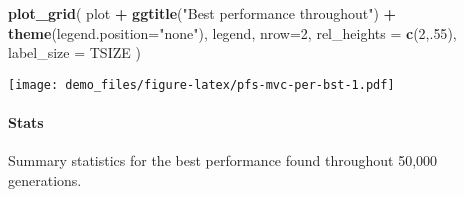 \documentclass[]{book}
\newenvironment{Shaded}{\begin{snugshade}}{\end{snugshade}}
\newcommand{\DataTypeTok}[1]{\textcolor[rgb]{0.13,0.29,0.53}{#1}}
\newcommand{\DecValTok}[1]{\textcolor[rgb]{0.00,0.00,0.81}{#1}}
\newcommand{\FloatTok}[1]{\textcolor[rgb]{0.00,0.00,0.81}{#1}}
\newcommand{\KeywordTok}[1]{\textcolor[rgb]{0.13,0.29,0.53}{\textbf{#1}}}
\newcommand{\NormalTok}[1]{#1}
\newcommand{\OperatorTok}[1]{\textcolor[rgb]{0.81,0.36,0.00}{\textbf{#1}}}
\newcommand{\OtherTok}[1]{\textcolor[rgb]{0.56,0.35,0.01}{#1}}
\newcommand{\StringTok}[1]{\textcolor[rgb]{0.31,0.60,0.02}{#1}}
\let\oldparagraph\paragraph
\renewcommand{\paragraph}[1]{\oldparagraph{#1}\mbox{}}
\begin{document}
\begin{Shaded}
\begin{Highlighting}[]
\KeywordTok{plot_grid}\NormalTok{(}
\NormalTok{  plot }\OperatorTok{+}
\StringTok{    }\KeywordTok{ggtitle}\NormalTok{(}\StringTok{"Best performance throughout"}\NormalTok{) }\OperatorTok{+}
\StringTok{    }\KeywordTok{theme}\NormalTok{(}\DataTypeTok{legend.position=}\StringTok{"none"}\NormalTok{),}
\NormalTok{  legend,}
  \DataTypeTok{nrow=}\DecValTok{2}\NormalTok{,}
  \DataTypeTok{rel_heights =} \KeywordTok{c}\NormalTok{(}\DecValTok{2}\NormalTok{,.}\DecValTok{55}\NormalTok{),}
  \DataTypeTok{label_size =}\NormalTok{ TSIZE}
\NormalTok{)}
\end{Highlighting}
\end{Shaded}

\texttt{[image: demo\_files/figure-latex/pfs-mvc-per-bst-1.pdf]}

\hypertarget{stats-61}{%
\paragraph{Stats}\label{stats-61}}

Summary statistics for the best performance found throughout 50,000 generations.

\begin{Shaded}
\end{Shaded}
\end{document}
